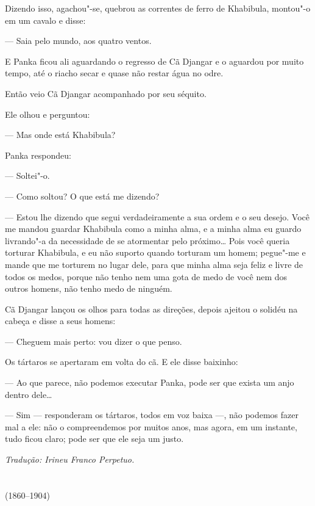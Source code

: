 Dizendo isso, agachou"-se, quebrou as correntes de ferro de Khabibula,
montou"-o em um cavalo e disse:

--- Saia pelo mundo, aos quatro ventos.

E Panka ficou ali aguardando o regresso de Cã Djangar e o aguardou por
muito tempo, até o riacho secar e quase não restar água no odre.

Então veio Cã Djangar acompanhado por seu séquito.

Ele olhou e perguntou:

--- Mas onde está Khabibula?

Panka respondeu:

--- Soltei"-o.

--- Como soltou? O que está me dizendo?

--- Estou lhe dizendo que segui verdadeiramente a sua ordem e o seu
desejo. Você me mandou guardar Khabibula como a minha alma, e a minha
alma eu guardo livrando"-a da necessidade de se atormentar pelo
próximo\ldots{} Pois você queria torturar Khabibula, e eu não suporto quando
torturam um homem; pegue"-me e mande que me torturem no lugar dele, para
que minha alma seja feliz e livre de todos os medos, porque não tenho
nem uma gota de medo de você nem dos outros homens, não tenho medo de
ninguém.

Cã Djangar lançou os olhos para todas as direções, depois ajeitou
o solidéu na cabeça e disse a seus homens:

--- Cheguem mais perto: vou dizer o que penso.

Os tártaros se apertaram em volta do cã. E ele disse baixinho:

--- Ao que parece, não podemos executar Panka, pode ser que exista um
anjo dentro dele\ldots{}

--- Sim --- responderam os tártaros, todos em voz baixa ---, não podemos
fazer mal a ele: não o compreendemos por muitos anos, mas agora, em um
instante, tudo ficou claro; pode ser que ele seja um justo.

\medskip

{\footnotesize\hfill\emph{Tradução: Irineu Franco Perpetuo.}}




\chapter*{}
\label{part6}
\thispagestyle{empty}

\begin{vplace}[1.5]
{\HUGES\hfill{}}

{\LARGE\hfill\textlt(1860–1904)}
\end{vplace}


